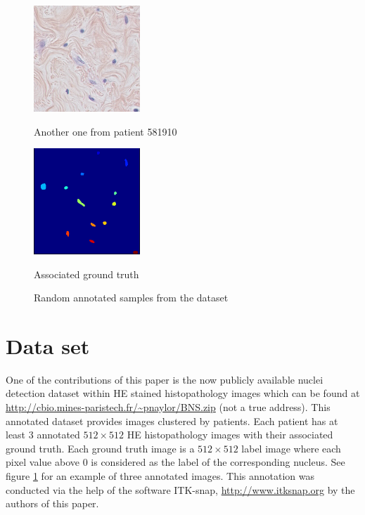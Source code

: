 \documentclass{article}
\begin{document}
\begin{figure}[htb]
\begin{minipage}[b]{.48\linewidth}
  \centering
  \centerline{\includegraphics[width=4.0cm]{RGB_3}}
  \centerline{Another one from patient 581910}\medskip
\end{minipage}
\hfill
\begin{minipage}[b]{0.48\linewidth}
  \centering
  \centerline{\includegraphics[width=4.0cm]{GT_3}}
  \centerline{Associated ground truth}\medskip
\end{minipage}
%
\caption{Random annotated samples from the dataset}
\label{fig:annotation}
%
\end{figure}


\section{Data set}
\label{sec:dataset}

\noindent One of the contributions of this paper is the now publicly available 
nuclei detection dataset within HE stained histopathology images which 
can be found at \url{http://cbio.mines-paristech.fr/~pnaylor/BNS.zip} 
(not a true address). This annotated dataset provides images clustered by 
patients. Each patient has at least 3 annotated $512 \times 512$ HE 
histopathology images with their associated ground truth. Each 
ground truth image is a $512 \times 512$ label image where each pixel value above 
$0$ is considered as the label of the corresponding nucleus. 
See figure \ref{fig:annotation} for an example of 
three annotated images. This annotation was conducted via the help of 
the software ITK-snap, \cite{py06nimg} \url{http://www.itksnap.org} by
the authors of this paper. 
\end{document}
